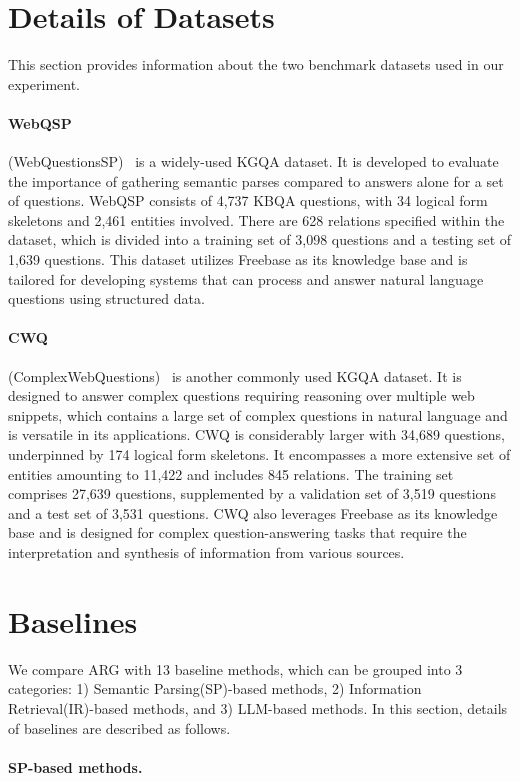 \section{Details of Datasets}
\label{app:datasets}
This section provides information about the two benchmark datasets used in our experiment.
\paragraph {WebQSP} (WebQuestionsSP)~\citep{STAGG} is a widely-used KGQA dataset. It is developed to evaluate the importance of gathering semantic parses compared to answers alone for a set of questions. WebQSP consists of 4,737 KBQA questions, with 34 logical form skeletons and 2,461 entities involved. There are 628 relations specified within the dataset, which is divided into a training set of 3,098 questions and a testing set of 1,639 questions. This dataset utilizes Freebase as its knowledge base and is tailored for developing systems that can process and answer natural language questions using structured data.
\paragraph {CWQ} (ComplexWebQuestions)~\citep{CWQ} is another commonly used KGQA dataset. It is designed to answer complex questions requiring reasoning over multiple web snippets, which contains a large set of complex questions in natural language and is versatile in its applications. CWQ is considerably larger with 34,689 questions, underpinned by 174 logical form skeletons. It encompasses a more extensive set of entities amounting to 11,422 and includes 845 relations. The training set comprises 27,639 questions, supplemented by a validation set of 3,519 questions and a test set of 3,531 questions. CWQ also leverages Freebase as its knowledge base and is designed for complex question-answering tasks that require the interpretation and synthesis of information from various sources.

\section{Baselines}
\label{app:baseline}
We compare ARG with 13 baseline methods, which can be grouped into 3 categories: 1) Semantic Parsing(SP)-based methods, 2) Information Retrieval(IR)-based methods, and 3) LLM-based methods. In this section, details of baselines are described as follows.
\paragraph {SP-based methods.} 

